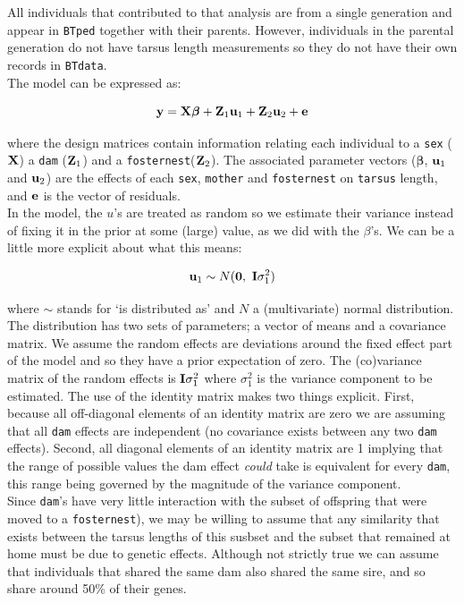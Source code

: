 \documentclass{article}
\begin{document}
All individuals that contributed to that analysis are from a single generation and appear in \texttt{BTped} together with their parents. However, individuals in the parental generation do not have tarsus length measurements so they do not have their own records in \texttt{BTdata}.\\

The model can be expressed as:

\begin{equation}
{\bf y}  = {\bf X}{\bm \beta}+{\bf Z}_{1}{\bf u}_{1}+{\bf Z}_{2}{\bf u}_{2}+{\bf e}
\end{equation}

where the design matrices contain information relating each individual to a  \texttt{sex} (${\bf X}$) a  \texttt{dam} (${\bf Z}_{1}$) and a \texttt{fosternest}(${\bf Z}_{2}$). The associated parameter vectors (${\bm \beta}$, ${\bf u}_{1}$ and ${\bf u}_{2}$) are the effects of each \texttt{sex}, \texttt{mother} and \texttt{fosternest} on \texttt{tarsus} length, and ${\bf e}$ is the vector of residuals.\\

In the model, the $u$'s are treated as random so we estimate their variance instead of fixing it in the prior at some (large) value, as we did with the $\beta$'s.  We can be a little more explicit about what this means:

\begin{equation}
{\bf u}_{1}  \sim N({\bf 0},\ {\bf I}\sigma^{2}_{1})
\end{equation}

where $\sim$ stands for `is distributed as' and $N$ a (multivariate) normal distribution. The distribution has two sets of parameters; a vector of means and a covariance matrix. We assume the random effects are deviations around the fixed effect part of the model and so they have a prior expectation  of zero. The (co)variance matrix of the random effects is ${\bf I}\sigma^{2}_{1}$ where $\sigma^{2}_{1}$ is the variance component to be estimated.  The use of the identity matrix makes two things explicit. First, because all off-diagonal elements of an identity matrix are zero we are assuming that all \texttt{dam} effects are independent (no covariance exists between any two \texttt{dam} effects). Second, all diagonal elements of an identity matrix are 1 implying that the range of possible values the dam effect \emph{could} take is equivalent for every \texttt{dam}, this range being governed by the magnitude of the variance component.\\

Since \texttt{dam}'s have very little interaction with the subset of offspring that were moved to a \texttt{fosternest}), we may be willing to assume that any similarity that exists between the tarsus lengths of this susbset and the subset  that remained at home must be due to genetic effects. Although not strictly true we can assume that individuals that shared the same dam also shared the same sire, and so share around 50\% of their genes.    


\ifalone
\end{document}
